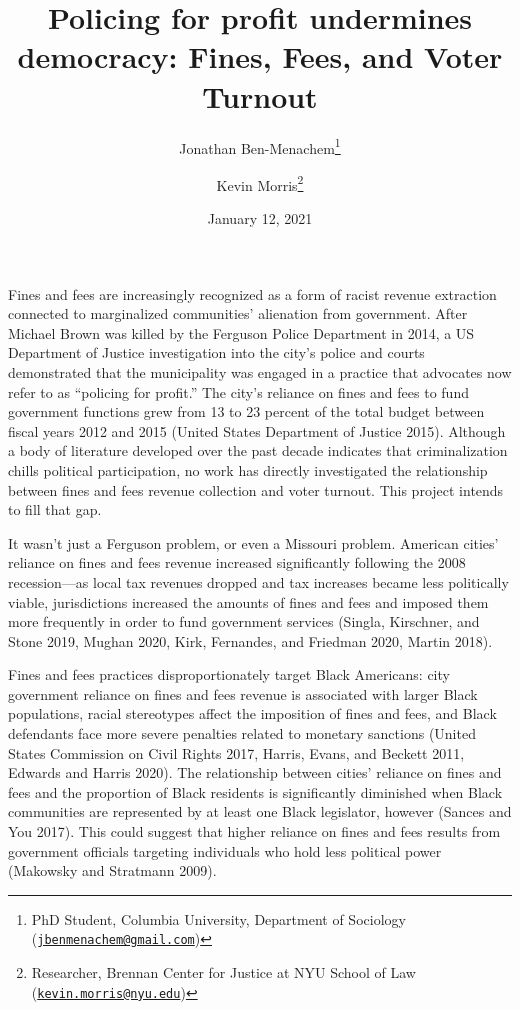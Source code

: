 \documentclass[
  12pt,
]{article}
\title{Policing for profit undermines democracy: Fines, Fees, and Voter Turnout}
\author{Jonathan Ben-Menachem\footnote{PhD Student, Columbia University, Department of Sociology (\href{mailto:jbenmenachem@gmail.com}{\nolinkurl{jbenmenachem@gmail.com}})} \and Kevin Morris\footnote{Researcher, Brennan Center for Justice at NYU School of Law (\href{mailto:kevin.morris@nyu.edu}{\nolinkurl{kevin.morris@nyu.edu}})}}
\date{January 12, 2021}
\begin{document}
\maketitle

\pagebreak


Fines and fees are increasingly recognized as a form of racist revenue extraction connected to marginalized communities' alienation from government. After Michael Brown was killed by the Ferguson Police Department in 2014, a US Department of Justice investigation into the city's police and courts demonstrated that the municipality was engaged in a practice that advocates now refer to as ``policing for profit.'' The city's reliance on fines and fees to fund government functions grew from 13 to 23 percent of the total budget between fiscal years 2012 and 2015 (United States Department of Justice 2015). Although a body of literature developed over the past decade indicates that criminalization chills political participation, no work has directly investigated the relationship between fines and fees revenue collection and voter turnout. This project intends to fill that gap.

It wasn't just a Ferguson problem, or even a Missouri problem. American cities' reliance on fines and fees revenue increased significantly following the 2008 recession---as local tax revenues dropped and tax increases became less politically viable, jurisdictions increased the amounts of fines and fees and imposed them more frequently in order to fund government services (Singla, Kirschner, and Stone 2019, Mughan 2020, Kirk, Fernandes, and Friedman 2020, Martin 2018).

Fines and fees practices disproportionately target Black Americans: city government reliance on fines and fees revenue is associated with larger Black populations, racial stereotypes affect the imposition of fines and fees, and Black defendants face more severe penalties related to monetary sanctions (United States Commission on Civil Rights 2017, Harris, Evans, and Beckett 2011, Edwards and Harris 2020). The relationship between cities' reliance on fines and fees and the proportion of Black residents is significantly diminished when Black communities are represented by at least one Black legislator, however (Sances and You 2017). This could suggest that higher reliance on fines and fees results from government officials targeting individuals who hold less political power (Makowsky and Stratmann 2009).
\end{document}
